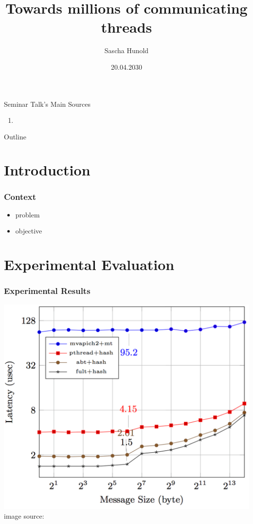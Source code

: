 \documentclass[presentation,professionalfonts]{beamer}
\institute[TU Wien]{Seminar ``\semname''\\\semester}
\date{20.04.2030}
\title[MPI and Communicating Threads]{Towards millions of communicating threads}
\author[Sascha Hunold]{Sascha Hunold}
\begin{document}
\maketitle


\begin{frame}{Seminar Talk's Main Sources}
  \begin{enumerate}
  \item {}
  \end{enumerate}
\end{frame}

\begin{frame}{Outline}
  \tableofcontents
\end{frame}

\section{Introduction}

\begin{frame}
  \frametitle{Context}
  \begin{itemize}
  \item problem 
  \item objective
  \end{itemize}
\end{frame}

\section{Experimental Evaluation}

\begin{frame}
  \frametitle{Experimental Results}
  \begin{center}
  \includegraphics[width=.7\textwidth]{./graph1}\\
  image source: \textcite{Dang16}
  \end{center}
\end{frame}
\end{document}

